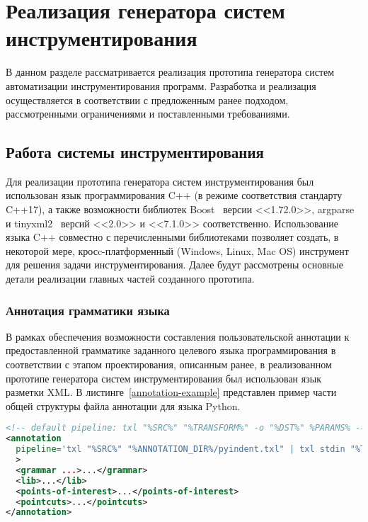 \chapter{Реализация генератора систем инструментирования}

В данном разделе рассматривается реализация прототипа генератора систем автоматизации инструментирования программ.
Разработка и реализация осуществляется в соответствии с предложенным ранее подходом, рассмотренными ограничениями и поставленными требованиями.

\section{Работа системы инструментирования}

Для реализации прототипа генератора систем инструментирования был использован язык программирования C++ (в режиме соответствия стандарту C++17), а также возможности библиотек Boost~\cite{boost} версии <<1.72.0>>, argparse~\cite{argparse} и tinyxml2~\cite{tinyxml2} версий <<2.0>> и <<7.1.0>> соответственно.
Использование языка C++ совместно с перечисленными библиотеками позволяет создать, в некоторой мере, кросc-платформенный (Windows, Linux, Mac OS) инструмент для решения задачи инструментирования.
Далее будут рассмотрены основные детали реализации главных частей созданного прототипа.

\subsection{Аннотация грамматики языка}

В рамках обеспечения возможности составления пользовательской аннотации к предоставленной грамматике заданного целевого языка программирования в соответствии с этапом проектирования, описанным ранее, в реализованном прототипе генератора систем инструментирования был использован язык разметки XML.
В листинге~\ref{annotation-example} представлен пример части общей структуры файла аннотации для языка Python.

\begin{lstlisting}[frame=single, language=XML, label={annotation-example}, caption={Пример общей структуры файла аннотации.}]
<!-- default pipeline: txl "%SRC%" "%TRANSFORM%" -o "%DST%" %PARAMS% -->
<annotation
  pipeline='txl "%SRC%" "%ANNOTATION_DIR%/pyindent.txl" | txl stdin "%TRANSFORM%" -o "%DST%" %PARAMS%'
  >
  <grammar ...>...</grammar>
  <lib>...</lib>
  <points-of-interest>...</points-of-interest>
  <pointcuts>...</pointcuts>
</annotation>
\end{lstlisting}

